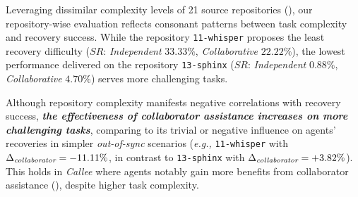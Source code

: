 Leveraging dissimilar complexity levels of 21 source repositories (), our repository-wise evaluation reflects consonant patterns between task complexity and recovery success.
While the repository \texttt{11-whisper} proposes the least recovery difficulty ($SR$: \textit{Independent} $33.33\%$, \textit{Collaborative} $22.22\%$),
the lowest performance delivered on the repository \texttt{13-sphinx} ($SR$: \textit{Independent} $0.88\%$, \textit{Collaborative} $4.70\%$) serves more challenging tasks.

Although repository complexity manifests negative correlations with recovery success, \textbf{\textit{the effectiveness of collaborator assistance increases on more challenging tasks}}, comparing to its trivial or negative influence on agents' recoveries in simpler \textit{out-of-sync} scenarios (\textit{e.g.,} \texttt{11-whisper} with $\Delta_{\textit{\text{collaborator}}}=-11.11\%$, in contrast to \texttt{13-sphinx} with $\Delta_{\textit{\text{collaborator}}}=+3.82\%$).
This holds in \textit{Callee} where agents notably gain more benefits from collaborator assistance (), despite higher task complexity.





